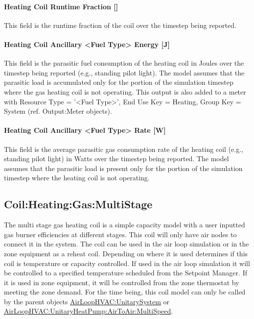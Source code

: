 \paragraph{Heating Coil Runtime Fraction {[]}}\label{heating-coil-runtime-fraction-3}

This field is the runtime fraction of the coil over the timestep being reported.

\paragraph{Heating Coil Ancillary <Fuel Type> Energy {[}J{]}}\label{heating-coil-ancillary-gas-energy-j}

This field is the parasitic fuel consumption of the heating coil in Joules over the timestep being reported (e.g., standing pilot light). The model assumes that the parasitic load is accumulated only for the portion of the simulation timestep where the gas heating coil is not operating. This output is also added to a meter with Resource Type = '<Fuel Type>', End Use Key = Heating, Group Key = System (ref. Output:Meter objects).

\paragraph{Heating Coil Ancillary <Fuel Type> Rate {[}W{]}}\label{heating-coil-ancillary-gas-rate-w}

This field is the average parasitic gas consumption rate of the heating coil (e.g., standing pilot light) in Watts over the timestep being reported. The model assumes that the parasitic load is present only for the portion of the simulation timestep where the heating coil is not operating.

\subsection{Coil:Heating:Gas:MultiStage}\label{coilheatinggasmultistage}

The multi stage gas heating coil is a simple capacity model with a user inputted gas burner efficiencies at different stages. This coil will only have air nodes to connect it in the system. The coil can be used in the air loop simulation or in the zone equipment as a reheat coil. Depending on where it is used determines if this coil is temperature or capacity controlled. If used in the air loop simulation it will be controlled to a specified temperature scheduled from the Setpoint Manager. If it is used in zone equipment, it will be controlled from the zone thermostat by meeting the zone demand. For the time being, this coil model can only be called by the parent objects \hyperref[airloophvacunitarysystem]{AirLoopHVAC:UnitarySystem} or \hyperref[airloophvacunitaryheatpumpairtoairmultispeed]{AirLoopHVAC:UnitaryHeatPump:AirToAir:MultiSpeed}.

